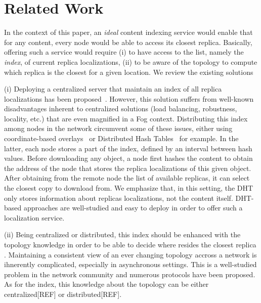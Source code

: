 \section{Related Work}
\label{related_work}


In the context of this paper, an \textit{ideal} content indexing service would enable that for any content, every node would be able to access its closest replica.
Basically, offering such a service would require (i) to have access to the list, namely the \textit{index}, of current replica localizations, (ii) to be aware of the topology to compute which replica is the closest for a given location. We review the existing solutions 

(i) Deploying a centralized server that maintain an index of all replica localizations has been proposed~\cite{fogstore, p2p-alto, p2p-oracle, snamp}. However, this solution suffers from well-known disadvantages inherent to centralized solutions (load balancing, robustness, locality, etc.) that are even magnified in a Fog context.
Distributing this index among nodes in the network circumvent some of these issues, either using coordinate-based overlays~\cite{coin_19, voronet} or Distributed Hash Tables~\cite{squirrel, ipfs, dht-name-resolution, mdht} for example. In the latter, each node stores a part of the index, defined by an interval between hash values. 
Before downloading any object, a node first
hashes the content to obtain the address of the node that stores the replica localizations of this given object. After obtaining from the remote node the list of available replicas, it can select the closest copy to download from. We emphasize that, in this setting, the DHT only stores information about replicas localizations, not the content itself. DHT-based approaches are well-studied and easy to deploy in order to offer such a localization service. 

(ii) Being centralized or distributed, this index should be enhanced with the topology knowledge in order to be able to decide where resides the closest replica . Maintaining a consistent view of an ever changing topology accross a network is ihnerently complicated, especially in asynchronous settings. This is a well-studied problem in the network community and numerous protocols have been proposed. As for the index, this knowledge about the topology can be either centralized[REF] or distributed[REF].


